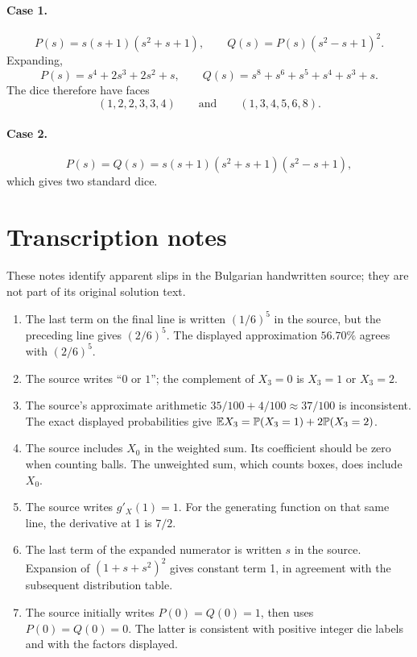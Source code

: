 \documentclass[11pt,a4paper]{article}
\begin{document}
\paragraph{Case 1.}
\[
P(s)=s(s+1)(s^2+s+1),\qquad Q(s)=P(s)(s^2-s+1)^2.
\]
Expanding,
\[
P(s)=s^4+2s^3+2s^2+s,\qquad Q(s)=s^8+s^6+s^5+s^4+s^3+s.
\]
The dice therefore have faces
\[
(1,2,2,3,3,4)\qquad\text{and}\qquad(1,3,4,5,6,8).
\]
\paragraph{Case 2.}
\[
P(s)=Q(s)=s(s+1)(s^2+s+1)(s^2-s+1),
\]
which gives two standard dice.

\section*{Transcription notes}
These notes identify apparent slips in the Bulgarian handwritten source; they are not part of its original solution text.
\begin{enumerate}
\item The last term on the final line is written $(1/6)^5$ in the source, but the preceding line gives $(2/6)^5$. The displayed approximation $56.70\%$ agrees with $(2/6)^5$.
\item The source writes ``$0$ or $1$''; the complement of $X_3=0$ is $X_3=1$ or $X_3=2$.
\item The source's approximate arithmetic $35/100+4/100\approx37/100$ is inconsistent. The exact displayed probabilities give $\mathbb {E} X_3=\mathbb P(X_3=1)+2\mathbb P(X_3=2)$.
\item The source includes $X_0$ in the weighted sum. Its coefficient should be zero when counting balls. The unweighted sum, which counts boxes, does include $X_0$.
\item The source writes $g'_X(1)=1$. For the generating function on that same line, the derivative at 1 is $7/2$.
\item The last term of the expanded numerator is written $s$ in the source. Expansion of $(1+s+s^2)^2$ gives constant term 1, in agreement with the subsequent distribution table.
\item The source initially writes $P(0)=Q(0)=1$, then uses $P(0)=Q(0)=0$. The latter is consistent with positive integer die labels and with the factors displayed.
\end{enumerate}
\end{document}
